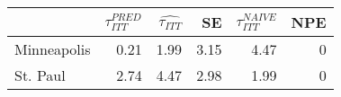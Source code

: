 
\begin{tabular}{lrrrrr}
\toprule
  & $\tau_{ITT}^{PRED}$ & $\hat{\tau_{ITT}}$ & SE & $\tau_{ITT}^{NAIVE}$ & NPE\\
\midrule
Minneapolis & 0.21 & 1.99 & 3.15 & 4.47 & 0\\
St. Paul & 2.74 & 4.47 & 2.98 & 1.99 & 0\\
\bottomrule
\end{tabular}